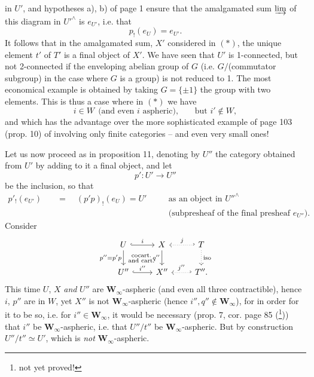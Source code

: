 \documentclass[11pt]{article}
\newcommand{\printedpage}[1]{\marginpar{\footnotesize p.~#1}}
\newcommand{\msp}[1]{\marginpar{\footnotesize [#1]}}
\newcommand{\Winf}{\mathbf{W}_{\infty}}
\begin{document}
\printedpage{5}

in $U'$, and hypotheses a), b) of page 1 ensure that the amalgamated sum $\varinjlim$ of this diagram in $U'^{\wedge}$ is $e_{U'}$, i.e. that
\[ p_!(e_U) = e_{U'}. \]
It follows that in the amalgamated sum, $X'$ considered in $(*)$, the unique element $t'$ of $T'$ is a final object of $X'$. We have seen that $U'$ is 1-connected, but not 2-connected if the enveloping abelian group of $G$ (i.e. $G/$(commutator subgroup) in the case where $G$ is a group) is not reduced to 1. The most economical example is obtained by taking $G = \{\pm 1\}$ the group with two elements. This is thus a case where in $(*)$ we have
\[ i \in W \ \ \text{(and even $i$ aspheric),} \qquad \text{but } i' \notin W, \]
and which has the advantage over the more sophisticated example of page 103 (prop. 10) of involving only finite categories -- and even very small ones!

Let us now proceed as in proposition 11, denoting by $U''$ the category obtained from $U'$ by adding to it a final
\msp{page 7}
object, and let
\[ p' : U' \longrightarrow U'' \]
be the inclusion, so that
\[
\begin{aligned}
p'_!(e_{U'}) \quad &= \quad (p'p)_!(e_U) = U' \quad && \text{as an object in } U''^{\wedge}\\
& && \text{(subpresheaf of the final presheaf } e_{U''}\text{).}
\end{aligned}
\]
Consider
\[
\begin{tikzcd}
U \arrow[r, hook, "i"] \arrow[d, "{p''=p'p}"'] \arrow[dr, phantom, "\begin{smallmatrix}\text{cocart.}\\ \text{and cart.}\end{smallmatrix}"] & X \arrow[d, "q''"'] & T \arrow[l, hook', dotted, "j"'] \arrow[d, dotted, "\text{iso}"] \\
U'' \arrow[r, hook, "i''"] & X'' & T''. \arrow[l, hook', dotted, "j''"']
\end{tikzcd}
\]
This time $U$, $X$ \textit{and} $U''$ are $\Winf$-aspheric (and even all three contractible), hence $i$, $p''$ are in $W$, yet $X''$ is not $\Winf$-aspheric (hence $i'', q'' \notin \Winf$), for in order for it to be so, i.e. for $i'' \in \Winf$, it would be necessary (prop. 7, cor. page 85 (\footnote[4]{not yet proved!})) that $i''$ be $\Winf$-aspheric, i.e. that $U''/t''$ be $\Winf$-aspheric. But by construction $U''/t'' \simeq U'$, which is \textit{not} $\Winf$-aspheric.
\end{document}

